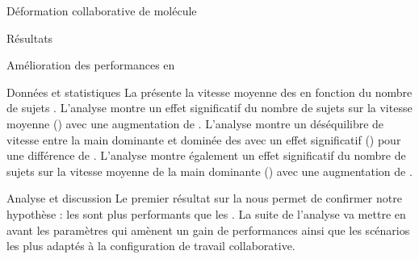 \documentclass[myfrancais,ngerman,english,french]{mythesis}
\begin{document}
\begin{mychapter}{Déformation collaborative de molécule}
\begin{mysection}{Résultats}
\begin{mysubsection}{Amélioration des performances en }
\begin{mysubsubsection}{Données et statistiques}
					La  présente la vitesse moyenne des   en fonction du nombre de sujets .
					L'analyse montre un effet significatif du nombre de sujets  sur la vitesse moyenne  () avec une augmentation de .
					L'analyse montre un déséquilibre de vitesse entre la main dominante et dominée des  avec un effet significatif () pour une différence de .
					L'analyse montre également un effet significatif du nombre de sujets  sur la vitesse moyenne  de la main dominante () avec une augmentation de .
				\end{mysubsubsection}
				\begin{mysubsubsection}{Analyse et discussion}
					Le premier résultat sur la  nous permet de confirmer notre hypothèse  : les  sont plus performants que les .
					La suite de l'analyse va mettre en avant les paramètres qui amènent un gain de performances ainsi que les scénarios les plus adaptés à la configuration de travail collaborative.


\end{mysubsubsection}
\end{mysubsection}
\end{mysection}
\end{mychapter}
\end{document}
